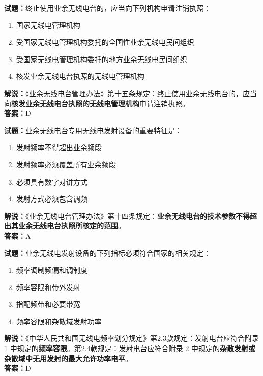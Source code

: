 \documentclass{ctexbook}
\begin{document}
\bigskip


\noindent\textbf{试题：}终止使用业余无线电台的，应当向下列机构申请注销执照：
\begin{enumerate}[leftmargin=3em]
\item 国家无线电管理机构
\item 受国家无线电管理机构委托的全国性业余无线电民间组织
\item 受国家无线电管理机构委托的地方业余无线电民间组织
\item 核发业余无线电台执照的无线电管理机构
\end{enumerate}
\noindent\textbf{解说：}《业余无线电台管理办法》第十五条规定：终止使用业余无线电台的，应当向\textbf{核发业余无线电台执照的无线电管理机构}申请注销执照。\\\noindent\textbf{答案：}D




\bigskip


\noindent\textbf{试题：}业余无线电台专用无线电发射设备的重要特征是：
\begin{enumerate}[leftmargin=3em]
\item 发射频率不得超出业余频段
\item 发射频率必须覆盖所有业余频段
\item 必须具有数字对讲方式
\item 发射方式必须包含调频
\end{enumerate}
\noindent\textbf{解说：}《业余无线电台管理办法》第十四条规定：\textbf{业余无线电台的技术参数不得超出其业余无线电台执照所核定的范围}。\\\noindent\textbf{答案：}A



\bigskip


\noindent\textbf{试题：}业余无线电发射设备的下列指标必须符合国家的相关规定：
\begin{enumerate}[leftmargin=3em]
\item 频率调制频偏和调制度
\item 频率容限和带外发射
\item 指配频带和必要带宽
\item 频率容限和杂散域发射功率
\end{enumerate}
\noindent\textbf{解说：}《中华人民共和国无线电频率划分规定》第2.3款规定：发射电台应符合附录 1 中规定的\textbf{频率容限}。第2.4款规定：发射电台应符合附录 2 中规定的\textbf{杂散发射或杂散域中无用发射的最大允许功率电平}。\\\noindent\textbf{答案：}D
\end{document}
